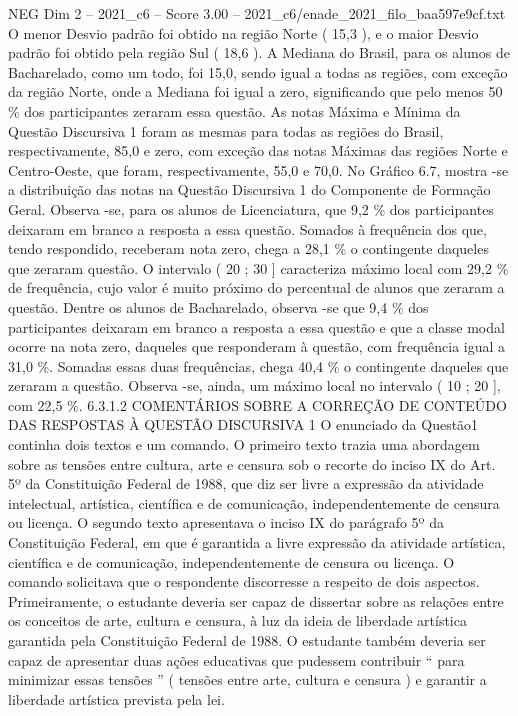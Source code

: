 \begin{textsample}{NEG Dim 2 – 2021\_c6 – Score 3.00 – 2021\_c6/enade\_2021\_filo\_baa597e9cf.txt}
O menor Desvio padrão foi obtido na região Norte ( 15,3 ), e o maior Desvio padrão foi obtido pela região Sul ( 18,6 ).
A Mediana do Brasil, para os alunos de Bacharelado, como um todo, foi 15,0, sendo igual a todas as regiões, com exceção da região Norte, onde a Mediana foi igual a zero, significando que pelo menos 50 \% dos participantes zeraram essa questão.
As notas Máxima e Mínima da Questão Discursiva 1 foram as mesmas para todas as regiões do Brasil, respectivamente, 85,0 e zero, com exceção das notas Máximas das regiões Norte e Centro-Oeste, que foram, respectivamente, 55,0 e 70,0.
No Gráfico 6.7, mostra -se a distribuição das notas na Questão Discursiva 1 do Componente de Formação Geral.
Observa -se, para os alunos de Licenciatura, que 9,2 \% dos participantes deixaram em branco a resposta a essa questão.
Somados à frequência dos que, tendo respondido, receberam nota zero, chega a 28,1 \% o contingente daqueles que zeraram questão.
O intervalo ( 20 ; 30 ] caracteriza máximo local com 29,2 \% de frequência, cujo valor é muito próximo do percentual de alunos que zeraram a questão.
Dentre os alunos de Bacharelado, observa -se que 9,4 \% dos participantes deixaram em branco a resposta a essa questão e que a classe modal ocorre na nota zero, daqueles que responderam à questão, com frequência igual a 31,0 \%.
Somadas essas duas frequências, chega 40,4 \% o contingente daqueles que zeraram a questão.
Observa -se, ainda, um máximo local no intervalo ( 10 ; 20 ], com 22,5 \%. 6.3.1.2 COMENTÁRIOS SOBRE A CORREÇÃO DE CONTEÚDO DAS RESPOSTAS À QUESTÃO DISCURSIVA 1 O enunciado da Questão1 continha dois textos e um comando.
O primeiro texto trazia uma abordagem sobre as tensões entre cultura, arte e censura sob o recorte do inciso IX do Art. 5º da Constituição Federal de 1988, que diz ser livre a expressão da atividade intelectual, artística, científica e de comunicação, independentemente de censura ou licença.
O segundo texto apresentava o inciso IX do parágrafo 5º da Constituição Federal, em que é garantida a livre expressão da atividade artística, científica e de comunicação, independentemente de censura ou licença.
O comando solicitava que o respondente discorresse a respeito de dois aspectos.
Primeiramente, o estudante deveria ser capaz de dissertar sobre as relações entre os conceitos de arte, cultura e censura, à luz da ideia de liberdade artística garantida pela Constituição Federal de 1988.
O estudante também deveria ser capaz de apresentar duas ações educativas que pudessem contribuir “ para minimizar essas tensões ” ( tensões entre arte, cultura e censura ) e garantir a liberdade artística prevista pela lei.

\end{textsample}
